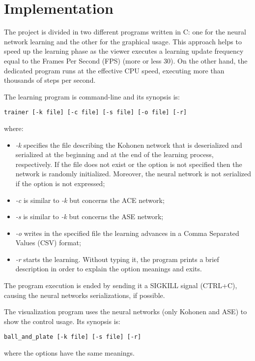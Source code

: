 
\section{Implementation}
\label{sec:impl}

The project is divided in two different programs written in C:
one for the neural network learning and the other for the graphical usage.
This approach helps to speed up the learning phase as the viewer executes a
learning update frequency equal to the Frames Per Second (FPS)
(more or less 30).
On the other hand, the dedicated program runs at the effective CPU speed,
executing more than thousands of steps per second.

The learning program is command-line and its synopsis is:
\begin{verbatim}
trainer [-k file] [-c file] [-s file] [-o file] [-r]
\end{verbatim}
where:
\begin{itemize}
    \item \emph{-k} specifies the file describing the Kohonen
             network that is deserialized and serialized at the beginning and
             at the end of the learning process, respectively.
             If the file does not exist or the option is not specified then the
             network is randomly initialized.
             Moreover, the neural network is not serialized if the option is
             not expressed;
    \item \emph{-c} is similar to \emph{-k} but concerns the ACE network;
    \item \emph{-s} is similar to \emph{-k} but concerns the ASE network;
    \item \emph{-o} writes in the specified file the learning advances in a
                    Comma Separated Values (CSV) format;
    \item \emph{-r} starts the learning. Without typing it, the program prints a
                    brief description in order to explain the option meanings
                    and exits.
\end{itemize}
The program execution is ended by sending it a SIGKILL signal (CTRL+C),
causing the neural networks serializations, if possible.

The visualization program uses the neural networks (only Kohonen and ASE)
to show the control usage.
Its synopsis is:
\begin{verbatim}
ball_and_plate [-k file] [-s file] [-r]
\end{verbatim}
where the options have the same meanings.

